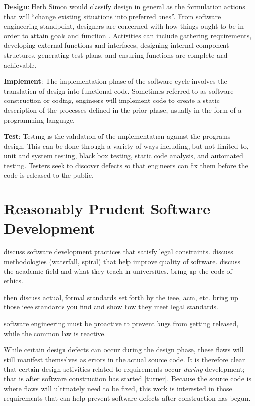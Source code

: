 \documentclass[12pt]{report}
\begin{document}
\textbf{Design}: Herb Simon would classify design in general as the formulation actions that will ``change existing situations into preferred ones''. From software engineering standpoint, designers are concerned with how things ought to be in order to attain goals and function \cite{simon}. Activities can include gathering requirements, developing external functions and interfaces, designing internal component structures, generating test plans, and ensuring functions are complete and achievable. 

\textbf{Implement}: The implementation phase of the software cycle involves the translation of design into functional code. Sometimes referred to as software construction or coding, engineers will implement code to create a static description of the processes defined in the prior phase, usually in the form of a programming language. 

\textbf{Test}: Testing is the validation of the implementation against the programs design. This can be done through a variety of ways including, but not limited to, unit and system testing, black box testing, static code analysis, and automated testing. Testers seek to discover defects so that engineers can fix them before the code is released to the public. 

\section{Reasonably Prudent Software Development} 
discuss software development practices that satisfy legal constraints. discuss methodologies (waterfall, spiral) that help improve quality of software. discuss the academic field and what they teach in universities. bring up the code of ethics.  

then discuss actual, formal standards set forth by the ieee, acm, etc. bring up those ieee standards you find and show how they meet legal standards.  

software engineering must be proactive to prevent bugs from getting released, while the common law is reactive. 

While certain design defects can occur during the design phase, these flaws will still manifest themselves as errors in the actual source code. It is therefore clear that certain design activities related to requirements occur \textit{during} development; that is after software construction has started [turner]. Because the source code is where flaws will ultimately need to be fixed, this work is interested in those requirements that can help prevent software defects after construction has begun. 
\end{document}

